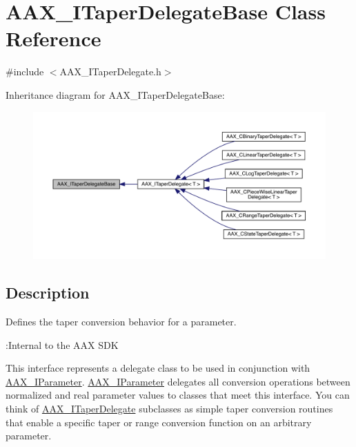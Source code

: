 \hypertarget{a01877}{}\section{A\+A\+X\+\_\+\+I\+Taper\+Delegate\+Base Class Reference}
\label{a01877}


{\ttfamily \#include $<$A\+A\+X\+\_\+\+I\+Taper\+Delegate.\+h$>$}



Inheritance diagram for A\+A\+X\+\_\+\+I\+Taper\+Delegate\+Base\+:
\nopagebreak
\begin{figure}[H]
\begin{center}
\leavevmode
\includegraphics[width=350pt]{a01876}
\end{center}
\end{figure}


\subsection{Description}
Defines the taper conversion behavior for a parameter. 

\begin{DoxyRefDesc}{\+:\+Internal to the A\+A\+X S\+DK}
\item[\mbox{\hyperlink{a00792__aax_sdk_internal000003}{\+:\+Internal to the A\+A\+X S\+DK}}]\end{DoxyRefDesc}


This interface represents a delegate class to be used in conjunction with \mbox{\hyperlink{a01857}{A\+A\+X\+\_\+\+I\+Parameter}}. \mbox{\hyperlink{a01857}{A\+A\+X\+\_\+\+I\+Parameter}} delegates all conversion operations between normalized and real parameter values to classes that meet this interface. You can think of \mbox{\hyperlink{a01881}{A\+A\+X\+\_\+\+I\+Taper\+Delegate}} subclasses as simple taper conversion routines that enable a specific taper or range conversion function on an arbitrary parameter.

